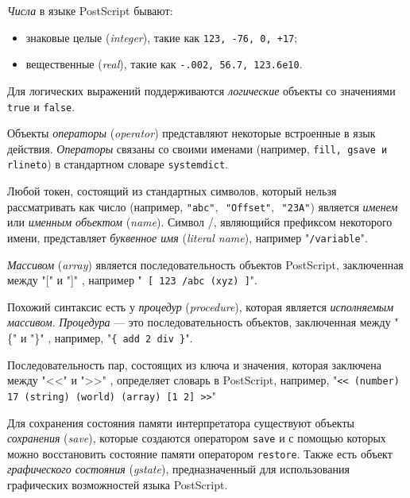 \textit{Числа} в языке PostScript бывают:
\begin{itemize}
\item знаковые целые (\textit{integer}), такие как \texttt{123, -76, 0, +17};
\item вещественные (\textit{real}), такие как \texttt{-.002, 56.7, 123.6e10}.
\end{itemize} 

Для логических выражений поддерживаются \textit{логические} объекты со значениями \texttt{true} и \texttt{false}. 

Объекты \textit{операторы} (\textit{operator})  представляют некоторые встроенные в язык действия. \textit{Операторы} связаны со своими именами (например, \texttt{fill, gsave и rlineto}) в стандартном словаре \texttt{systemdict}.


Любой токен, состоящий из стандартных символов, который нельзя рассматривать как число (например, \texttt{"abc"$,$ "Offset"$,$ "23A"}) является \textit{именем} или \textit{именным объектом} (\textit{name}). 
Символ /, являющийся префиксом некоторого имени, представляет \textit{буквенное имя} (\textit{literal name}), например "\texttt{/variable}".

\textit{Массивом} (\textit{array}) является последовательность объектов PostScript, заключенная между "[" и "]" $ $, например "\texttt{ [ 123  /abc (xyz) ]}".

Похожий синтаксис есть у \textit{процедур } (\textit{procedure}), которая является \textit{исполняемым массивом}. \textit{Процедура} --- это последовательность объектов, заключенная между "\{" и "\}"$ $ , например, "\texttt{\{ add 2 div \}}".

Последовательность пар, состоящих из ключа и значения, которая заключена между "$ $<<" и "$ $>>"$ $ , определяет словарь в PostScript, например, "\texttt {<< (number) 17 (string) (world) (array) [1 2]  >>}"

Для сохранения состояния памяти интерпретатора существуют объекты \textit{сохранения} (\textit{save}), которые создаются оператором \texttt{save} и с помощью которых можно восстановить состояние памяти оператором \texttt{restore}. Также есть объект \textit{графического состояния} (\textit{gstate}), предназначенный для использования графических возможностей языка PostScript.

